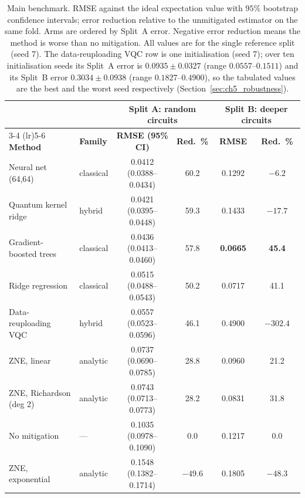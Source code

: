 \documentclass[Thesis.tex]{subfiles}
\begin{document}
\begin{table}[htbp]
\centering
\caption[Main benchmark, both splits]{Main benchmark. RMSE against the ideal expectation value with $95\%$
bootstrap confidence intervals; error reduction relative to the unmitigated
estimator on the same fold. Arms are ordered by Split~A error. Negative error
reduction means the method is worse than no mitigation. All values are for the
single reference split (seed 7). The data-reuploading VQC row is one initialisation
(seed 7); over ten initialisation seeds its Split~A error is $0.0935 \pm 0.0327$
(range $0.0557$--$0.1511$) and its Split~B error $0.3034 \pm 0.0938$ (range
$0.1827$--$0.4900$), so the tabulated values are the best and the worst seed
respectively (Section~\ref{sec:ch5_robustness}).}
\label{tab:ch5_main}
\small
\begin{tabular}{llcccc}
\toprule
& & \multicolumn{2}{c}{\textbf{Split A: random circuits}}
  & \multicolumn{2}{c}{\textbf{Split B: deeper circuits}} \\
\cmidrule(lr){3-4} \cmidrule(lr){5-6}
\textbf{Method} & \textbf{Family} & \textbf{RMSE (95\% CI)} & \textbf{Red.\ \%}
& \textbf{RMSE} & \textbf{Red.\ \%} \\
\midrule
Neural net (64,64)      & classical & 0.0412 (0.0388--0.0434) & 60.2 & 0.1292 & $-6.2$ \\
Quantum kernel ridge    & hybrid    & 0.0421 (0.0395--0.0448) & 59.3 & 0.1433 & $-17.7$ \\
Gradient-boosted trees  & classical & 0.0436 (0.0413--0.0460) & 57.8 & \textbf{0.0665} & \textbf{45.4} \\
Ridge regression        & classical & 0.0515 (0.0488--0.0543) & 50.2 & 0.0717 & 41.1 \\
Data-reuploading VQC    & hybrid    & 0.0557 (0.0523--0.0596) & 46.1 & 0.4900 & $-302.4$ \\
ZNE, linear             & analytic  & 0.0737 (0.0690--0.0785) & 28.8 & 0.0960 & 21.2 \\
ZNE, Richardson (deg 2) & analytic  & 0.0743 (0.0713--0.0773) & 28.2 & 0.0831 & 31.8 \\
No mitigation           & ---       & 0.1035 (0.0978--0.1090) & 0.0  & 0.1217 & 0.0 \\
ZNE, exponential        & analytic  & 0.1548 (0.1382--0.1714) & $-49.6$ & 0.1805 & $-48.3$ \\
\bottomrule
\end{tabular}
\end{table}
\end{document}
